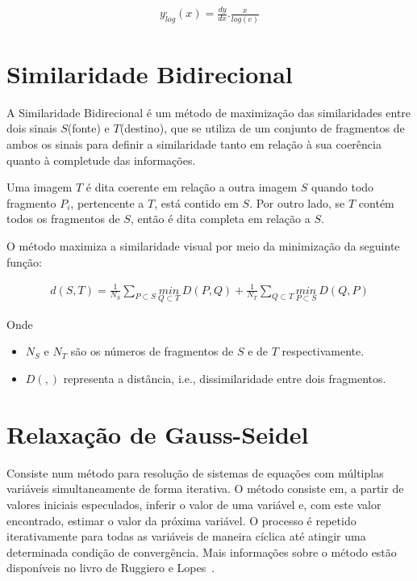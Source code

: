 \begin{align} \label{eqConceitoLog1}
          y^,_{log}(x) = \frac{dy}{dx}.\frac{x}{log(e)}
\end{align}

\section{Similaridade Bidirecional} \label{conceitoSimilaridadeBidirecional}
	A Similaridade Bidirecional \cite{simakov} é um método de maximização das similaridades entre dois sinais $S$(fonte) e $T$(destino), que se utiliza de um conjunto de fragmentos de ambos os sinais para definir a similaridade tanto em relação à sua coerência quanto à completude das informações.
	
	Uma imagem $T$ é dita coerente em relação a outra imagem $S$ quando todo fragmento $P_i$, pertencente a $T$, está contido em $S$. Por outro lado, se $T$ contém todos os fragmentos de $S$, então é dita completa em relação a $S$.
	
	O método maximiza a similaridade visual por meio da minimização da seguinte função:
	
\begin{align} \label{eqConceitoSimilaridade}
          d(S,T) = \frac{1}{N_S}\sum\limits_{P \subset S}{\underset{Q \subset T}{min}~D(P,Q)} + \frac{1}{N_T}\sum\limits_{Q \subset T}{\underset{P \subset S}{min}~D(Q,P)}
\end{align}

Onde
\begin{itemize}
	\item $N_S$ e $N_T$ são os números de fragmentos de $S$ e de $T$ respectivamente.
	\item $D(,)$ representa a distância, i.e., dissimilaridade entre dois fragmentos. 
\end{itemize} 
	

 \section{Relaxação de Gauss-Seidel} \label{conceitoGauss-Seidel}
	Consiste num método para resolução de sistemas de equações com múltiplas variáveis simultaneamente de forma iterativa. O método consiste em, a partir de valores iniciais especulados, inferir o valor de uma variável e, com este valor encontrado, estimar o valor da próxima variável. O processo é repetido iterativamente para todas as variáveis de maneira cíclica até atingir uma determinada condição de convergência. Mais informações sobre o método estão disponíveis no livro de Ruggiero e Lopes~\cite{livroCalculoNumerico}.
	

